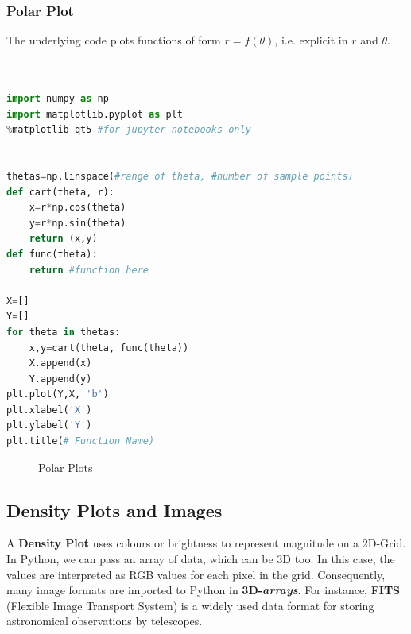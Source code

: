 \subsubsection{Polar Plot}
\par The underlying code plots functions of form $r=f(\theta)$, i.e. explicit in $r$ and $\theta$.
\\
\\ \\
\begin{lstlisting}[language=Python, caption=Polar Plot, frame=single ]
import numpy as np
import matplotlib.pyplot as plt
%matplotlib qt5 #for jupyter notebooks only


thetas=np.linspace(#range of theta, #number of sample points) 
def cart(theta, r):
	x=r*np.cos(theta)
	y=r*np.sin(theta)
	return (x,y)
def func(theta):
	return #function here

X=[]
Y=[]
for theta in thetas:
	x,y=cart(theta, func(theta))
	X.append(x)
	Y.append(y)
plt.plot(Y,X, 'b')
plt.xlabel('X')
plt.ylabel('Y')
plt.title(# Function Name)
\end{lstlisting}
\begin{figure}[H]
	\centering
	\caption{Polar Plots}%
	\label{fig:example}%
\end{figure}
\subsection{Density Plots and Images}
A \textbf{Density Plot} uses colours or brightness to represent magnitude on a 2D-Grid. In Python, we can pass an array of data, which can be 3D too. In this case, the values are interpreted as RGB values for each pixel in the grid. Consequently, many image formats are imported to Python in \textbf{3D-\textit{arrays}}. For instance, \textbf{FITS} (Flexible Image Transport System) is a widely used data format for storing astronomical observations by telescopes.\\
